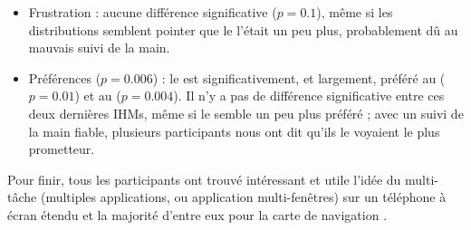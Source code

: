 \begin{itemize}
  \item Frustration : aucune différence significative ($p = \num{0.1}$), même si les distributions semblent pointer que le  l'était un peu plus, probablement dû au mauvais suivi de la main.
  \item Préférences ($p = \num{0.006}$) : le  est significativement, et largement, préféré au  ($p = \num{0.01}$) et au  ($p = \num{0.004}$). Il n'y a pas de différence significative entre ces deux dernières IHMs, même si le  semble un peu plus préféré ; avec un suivi de la main fiable, plusieurs participants nous ont dit qu'ils le voyaient le plus prometteur.
\end{itemize}

Pour finir, tous les participants ont trouvé intéressant et utile l'idée du multi-tâche (multiples applications, ou application multi-fenêtres) sur un téléphone à écran étendu  et la majorité d'entre eux pour la carte de navigation .